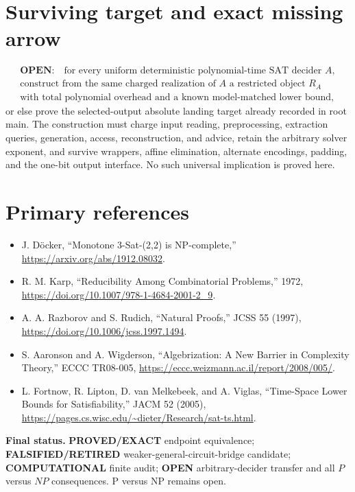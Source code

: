 \documentclass[11pt]{article}
\begin{document}
\section*{Surviving target and exact missing arrow}

\[
\boxed{
\begin{gathered}
\textbf{OPEN:}\quad
\text{for every uniform deterministic polynomial-time SAT decider }A,\\
\text{construct from the same charged realization of }A
\text{ a restricted object }R_A\\
\text{with total polynomial overhead and a known model-matched lower bound,}
\end{gathered}}
\]
or else prove the selected-output absolute landing target already recorded in root main.  The construction must charge input reading, preprocessing, extraction queries, generation, access, reconstruction, and advice, retain the arbitrary solver exponent, and survive wrappers, affine elimination, alternate encodings, padding, and the one-bit output interface.  No such universal implication is proved here.

\section*{Primary references}

\begin{itemize}
  \item J. D\"ocker, ``Monotone 3-Sat-(2,2) is NP-complete,'' \url{https://arxiv.org/abs/1912.08032}.
  \item R. M. Karp, ``Reducibility Among Combinatorial Problems,'' 1972, \url{https://doi.org/10.1007/978-1-4684-2001-2_9}.
  \item A. A. Razborov and S. Rudich, ``Natural Proofs,'' JCSS 55 (1997), \url{https://doi.org/10.1006/jcss.1997.1494}.
  \item S. Aaronson and A. Wigderson, ``Algebrization: A New Barrier in Complexity Theory,'' ECCC TR08-005, \url{https://eccc.weizmann.ac.il/report/2008/005/}.
  \item L. Fortnow, R. Lipton, D. van Melkebeek, and A. Viglas, ``Time-Space Lower Bounds for Satisfiability,'' JACM 52 (2005), \url{https://pages.cs.wisc.edu/~dieter/Research/sat-ts.html}.
\end{itemize}

\bigskip
\noindent\textbf{Final status.} \textbf{PROVED/EXACT} endpoint equivalence; \textbf{FALSIFIED/RETIRED} weaker-general-circuit-bridge candidate; \textbf{COMPUTATIONAL} finite audit; \textbf{OPEN} arbitrary-decider transfer and all \(P\) versus \(NP\) consequences.  P versus NP remains open.

\end{document}
